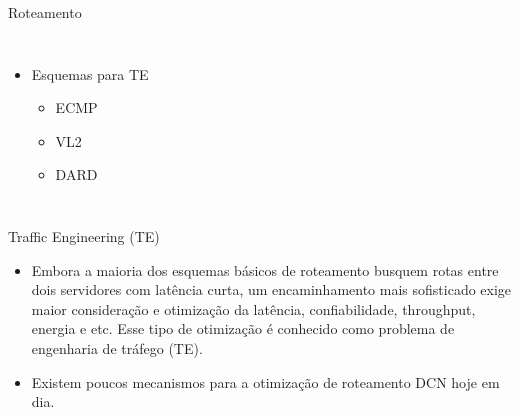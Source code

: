 \documentclass[aspectratio=169]{beamer}
\begin{document}
 
    \begin{frame} {Roteamento}
      				
                  \begin{columns}[t]    
                  	
                    
                    \begin{itemize}
                     
                    \setlength\itemsep{2em}
                       \large
                       \item
                          Esquemas para TE
                           
                       \begin{itemize}
                           
                           \item
                              	ECMP
                       
                           \item
                              	VL2
                       
                            \item
                               DARD 
                                       
                       \end{itemize}
                               
                    \end{itemize}
                   
                      
                 \end{columns} 
                
    \end{frame}
       

	 
	    \begin{frame} {Traffic Engineering (TE)}
	    	
	    	\begin{itemize}
	         \Large                  
             \item	
				Embora a maioria dos esquemas básicos de roteamento busquem rotas entre
				dois servidores com latência curta, um encaminhamento mais sofisticado exige maior
				consideração e otimização da latência, confiabilidade, throughput, energia e etc. Esse tipo
				de otimização é conhecido como problema de engenharia de tráfego (TE).

			\item
		     Existem poucos mecanismos para a otimização de roteamento DCN hoje em dia.
		        
	       \end{itemize}
	    \end{frame}    
\end{document}
